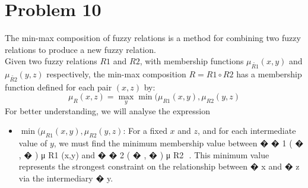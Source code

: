 \section{Problem 10}
The min-max composition of fuzzy relations is a method for combining two fuzzy relations to produce a new fuzzy relation. \\
Given two fuzzy relations $R1$ and $R2$, with membership functions $\mu_{\tilde{R1}}(x,y)$ and $\mu_{\tilde{R2}}(y,z)$ respectively, the min-max composition $R = R1 \circ R2 $ has a membership function defined for each pair $(x,z)$ by:
\begin{equation}
	\mu_R(x, z) = \max_{y} \min(\mu_{R1}(x, y), \mu_{R2}(y, z)
\end{equation}
For better understanding, we will analyse the expression
\begin{itemize}
	\item $\min(\mu_{R1}(x, y), \mu_{R2}(y, z)$: For a fixed $x$ and $z$, and for each intermediate value of $y$, we must find the minimum membership value between 
	�
	�
	1
	(
	�
	,
	�
	)
	μ 
	R1
	​
	(x,y) and 
	�
	�
	2
	(
	�
	,
	�
	)
	μ 
	R2
	​
	. This minimum value represents the strongest constraint on the relationship between 
	�
	x and 
	�
	z via the intermediary 
	�
	y.
	
\end{itemize}

	